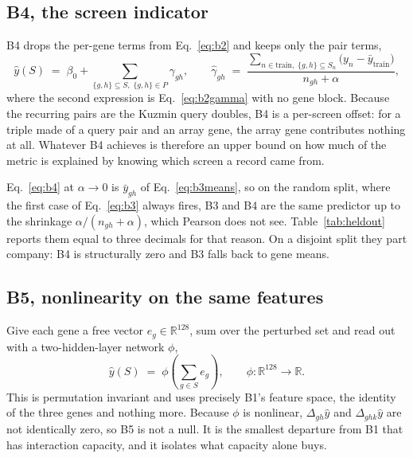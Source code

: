 \subsection{B4, the screen indicator}
\label{sec:b4}

B4 drops the per-gene terms from Eq.~\ref{eq:b2} and keeps only the pair terms,
%
\begin{equation}
  \hat{y}(S) \;=\; \beta_0 + \sum_{\{g,h\} \subseteq S,\; \{g,h\} \in P} \gamma_{gh} ,
  \qquad
  \hat{\gamma}_{gh} \;=\; \frac{\sum_{n \in \mathrm{train},\; \{g,h\} \subseteq S_n}
  \bigl(y_n - \bar{y}_{\mathrm{train}}\bigr)}{n_{gh} + \alpha} ,
  \label{eq:b4}
\end{equation}
%
where the second expression is Eq.~\ref{eq:b2gamma} with no gene block. Because
the recurring pairs are the Kuzmin query doubles, B4 is a per-screen offset: for
a triple made of a query pair and an array gene, the array gene contributes
nothing at all. Whatever B4 achieves is therefore an upper bound on how much of
the metric is explained by knowing which screen a record came from.

Eq.~\ref{eq:b4} at $\alpha \to 0$ is $\bar{y}_{gh}$ of Eq.~\ref{eq:b3means},
so on the random split, where the first case of Eq.~\ref{eq:b3} always fires,
B3 and B4 are the same predictor up to the shrinkage $\alpha/(n_{gh}+\alpha)$,
which Pearson does not see. Table~\ref{tab:heldout} reports them equal to three
decimals for that reason. On a disjoint split they part company: B4 is
structurally zero and B3 falls back to gene means.

\subsection{B5, nonlinearity on the same features}

Give each gene a free vector $e_g \in \mathbb{R}^{128}$, sum over the perturbed
set and read out with a two-hidden-layer network $\phi$,
%
\begin{equation}
  \hat{y}(S) \;=\; \phi\!\left(\sum_{g \in S} e_g\right),
  \qquad
  \phi : \mathbb{R}^{128} \to \mathbb{R}.
  \label{eq:b5}
\end{equation}
%
This is permutation invariant and uses precisely B1's feature space, the identity
of the three genes and nothing more. Because $\phi$ is nonlinear,
$\Delta_{gh}\hat{y}$ and $\Delta_{ghk}\hat{y}$ are not identically zero, so B5 is
not a null. It is the smallest departure from B1 that has interaction capacity,
and it isolates what capacity alone buys.

